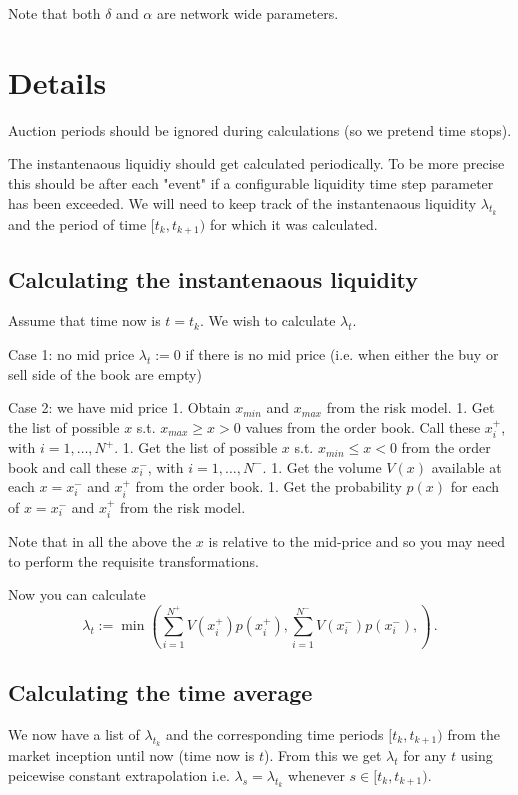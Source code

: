 \documentclass[10pt]{amsart}
\begin{document}
Note that both $\delta$ and $\alpha$  are network wide parameters.
	

\section*{Details}
Auction periods should be ignored during calculations (so we pretend time stops).

The instantenaous liquidiy should get calculated periodically.
To be more precise this should be after each "event" if a configurable liquidity time step parameter has been exceeded. 
We will need to keep track of the instantenaous liquidity $\lambda_{t_k}$ and the period of time $[t_k,t_{k+1})$ for which it was calculated.

\subsection*{Calculating the instantenaous liquidity}

Assume that time now is $t = t_k$. We wish to calculate $\lambda_t$.

Case 1: no mid price
$\lambda_t := 0$ if there is no mid price (i.e. when either the buy or sell side of the book are empty)

Case 2: we have mid price
1. Obtain $x_{min}$ and $x_{max}$ from the risk model. 
1. Get the list of possible $x$ s.t. $x_{max} \geq x > 0$ values from the order book. Call these $x^+_i$, with $i = 1,\ldots,N^+$. 
1. Get the list of possible $x$ s.t. $x_{min} \leq x < 0$ from the order book and call these $x^-_i$, with $i = 1, \ldots , N^-$. 
1. Get the volume $V(x)$ available at each $x = x^-_i$ and $x^+_i$ from the order book.
1. Get the probability $p(x)$ for each of $x = x^-_i$ and $x^+_i$ from the risk model. 

Note that in all the above the $x$ is relative to the mid-price and so you may need to perform the requisite transformations.

Now you can calculate 
$$
\lambda_t := 
\min\left(
    \sum_{i=1}^{N^+} V(x^+_i) p(x^+_i), 
    \sum_{i=1}^{N^-} V(x^-_i) p(x^-_i), 
\right)\,.
$$

\subsection*{Calculating the time average}

We now have a list of $\lambda_{t_k}$ and the corresponding time periods $[t_k,t_{k+1})$ from the market inception until now (time now is $t$). 
From this we get $\lambda_t$ for any $t$ using peicewise constant extrapolation i.e. $\lambda_s = \lambda_{t_k}$ whenever $s \in [t_k, t_{k+1})$.
\end{document}
